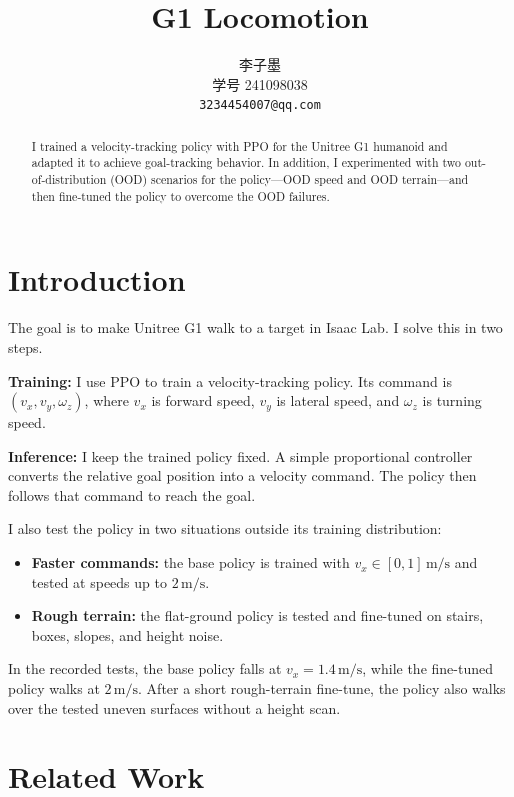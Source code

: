 \documentclass[11pt,a4paper]{article}
\title{G1 Locomotion}
\author{
  \begin{tabular}{c}
    李子墨 \\
    \small 学号 241098038 \\
    \small \texttt{3234454007@qq.com}
  \end{tabular}
}
\date{}
\begin{document}
\maketitle

\begin{abstract}

I trained a velocity-tracking policy with PPO for the Unitree G1 humanoid and adapted it to achieve goal-tracking behavior.
In addition, I experimented with two out-of-distribution (OOD) scenarios for the policy---OOD speed and OOD terrain---and then fine-tuned the policy to overcome the OOD failures.

\end{abstract}

\section{Introduction}

The goal is to make Unitree G1 walk to a target in Isaac Lab. I solve this in
two steps.

\textbf{Training:} I use PPO to train a velocity-tracking policy. Its command is
$(v_x,v_y,\omega_z)$, where $v_x$ is forward speed, $v_y$ is lateral speed, and
$\omega_z$ is turning speed.

\textbf{Inference:} I keep the trained policy fixed. A simple proportional
controller converts the relative goal position into a velocity command. The
policy then follows that command to reach the goal.

I also test the policy in two situations outside its training distribution:
\begin{itemize}
  \item \textbf{Faster commands:} the base policy is trained with
  $v_x\in[0,1]\,\mathrm{m/s}$ and tested at speeds up to
  $2\,\mathrm{m/s}$.
  \item \textbf{Rough terrain:} the flat-ground policy is tested and
  fine-tuned on stairs, boxes, slopes, and height noise.
\end{itemize}

In the recorded tests, the base policy falls at
$v_x=1.4\,\mathrm{m/s}$, while the fine-tuned policy walks at
$2\,\mathrm{m/s}$. After a short rough-terrain fine-tune, the policy
also walks over the tested uneven surfaces without a height scan.

\section{Related Work}
\label{sec:related}
\end{document}

